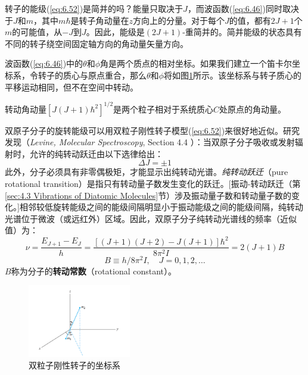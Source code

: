     转子的能级(\ref{eq:6.52})是简并的吗？能量只取决于$J$，而波函数(\ref{eq:6.46})同时取决于$J$和$m$，其中$m\hbar$是转子角动量在$z$方向上的分量。对于每个$J$的值，都有$2J+1$个$m$的可能值，从$-J$到$J$。因此，能级是$\left(2J+1\right)$-重简并的。简并能级的状态具有不同的转子绕空间固定轴方向的角动量矢量方向。

    波函数(\ref{eq:6.46})中的$\theta$和$\phi$角是两个质点的相对坐标。如果我们建立一个笛卡尔坐标系，令转子的质心与原点重合，那么$\theta$和$\phi$将如图\ref{fig:6.3}所示。该坐标系与转子质心的平移运动相同，但不在空间中转动。

    转动角动量$\left[J\left(J+1\right)\hbar^2\right]^{1/2}$是两个粒子相对于系统质心$C$处原点的角动量。

    双原子分子的旋转能级可以用双粒子刚性转子模型(\ref{eq:6.52})来很好地近似。研究发现（\textit{Levine, Molecular Spectroscopy}, Section 4.4 ）：当双原子分子吸收或发射辐射时，允许的纯转动跃迁由以下选律给出：
    \begin{equation}
        \Delta J = \pm 1
        \label{eq:6.53}
    \end{equation}
    此外，分子必须具有非零偶极矩，才能显示出纯转动光谱。\textit{纯转动跃迁}（pure rotational transition）是指只有转动量子数发生变化的跃迁。[振动-转动跃迁（第\ref{sec:4.3 Vibrations of Diatomic Molecules}节）涉及振动量子数和转动量子数的变化。]相邻较低旋转能级之间的能级间隔明显小于振动能级之间的能级间隔，纯转动光谱位于微波（或远红外）区域。因此，双原子分子纯转动光谱线的频率（近似值）为：
    \begin{equation}
        \nu = \frac{E_{J+1} - E_J}{h} = \frac{\left[\left(J+1\right)\left(J+2\right) - J\left(J+1\right)\right]\hbar^2}{8\pi^2 I} = 2\left(J+1\right)B
        \label{eq:6.54}
    \end{equation}
    \begin{equation}
        B \equiv h/8\pi^2 I, \quad J = 0, 1, 2, \ldots
        \label{eq:6.55}
    \end{equation}
    $B$称为分子的\textbf{转动常数}（rotational constant）。
    \begin{figure}[h!]
        \centering
        \includegraphics[width=0.4\textwidth]{Figures/6.3.png}
        \caption{双粒子刚性转子的坐标系}
        \label{fig:6.3}
    \end{figure}

